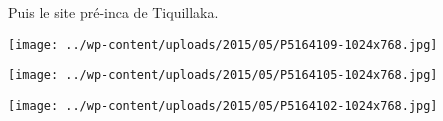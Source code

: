 

 Puis le site pré-inca de Tiquillaka. 

 

\begin{center} \texttt{[image: ../wp-content/uploads/2015/05/P5164109-1024x768.jpg]} \end{center}

 

 

\begin{center} \texttt{[image: ../wp-content/uploads/2015/05/P5164105-1024x768.jpg]} \end{center}

 

 

\begin{center} \texttt{[image: ../wp-content/uploads/2015/05/P5164102-1024x768.jpg]} \end{center}




 
 
